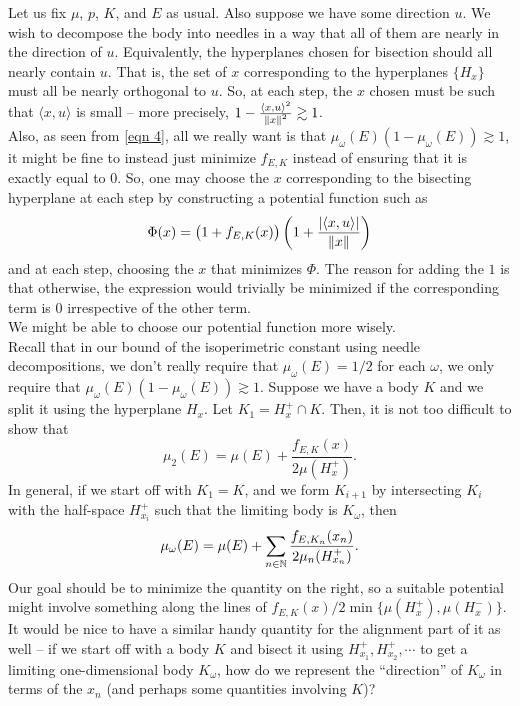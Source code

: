 \documentclass{article}
\begin{document}
		Let us fix $\mu$, $p$, $K$, and $E$ as usual. Also suppose we have some direction $u$. We wish to decompose the body into needles in a way that all of them are nearly in the direction of $u$. Equivalently, the hyperplanes chosen for bisection should all nearly contain $u$. That is, the set of $x$ corresponding to the hyperplanes $\{H_x\}$ must all be nearly orthogonal to $u$. So, at each step, the $x$ chosen must be such that $\langle x , u \rangle$ is small -- more precisely, $1 - \frac{\langle x , u \rangle^2}{\left\lVert x\right\rVert^2} \gtrsim 1$.\\
		Also, as seen from \eqref{eqn 4}, all we really want is that $\mu_\omega(E)(1-\mu_\omega(E)) \gtrsim 1$, it might be fine to instead just minimize $f_{E,K}$ instead of ensuring that it is exactly equal to $0$. So, one may choose the $x$ corresponding to the bisecting hyperplane at each step by constructing a potential function such as
		\[ \Phi(x) = \left(1 + f_{E,K}(x)\right) \left(1 + \frac{|\langle x , u \rangle|}{\left\lVert x\right\rVert}\right) \]
		and at each step, choosing the $x$ that minimizes $\Phi$. The reason for adding the $1$ is that otherwise, the expression would trivially be minimized if the corresponding term is $0$ irrespective of the other term.\\

		We might be able to choose our potential function more wisely.\\
		Recall that in our bound of the isoperimetric constant using needle decompositions, we don't really require that $\mu_\omega(E) = 1/2$ for each $\omega$, we only require that $\mu_\omega(E) (1 - \mu_\omega(E)) \gtrsim 1$. Suppose we have a body $K$ and we split it using the hyperplane $H_x$. Let $K_1 = H_x^+ \cap K$. Then, it is not too difficult to show that
		\[ \mu_2(E) = \mu(E) + \frac{f_{E,K}(x)}{2\mu(H_x^+)}. \]
		In general, if we start off with $K_1 = K$, and we form $K_{i+1}$ by intersecting $K_i$ with the half-space $H_{x_i}^+$ such that the limiting body is $K_\omega$, then
		\[ \mu_\omega(E) = \mu(E) + \sum_{n\in\mathbb{N}} \frac{f_{E,K_n}(x_n)}{2\mu_n(H_{x_n}^+)}. \]
		Our goal should be to minimize the quantity on the right, so a suitable potential might involve something along the lines of $f_{E,K}(x) / 2 \min\{ \mu(H_x^+) , \mu(H_x^-) \}$.\\

		It would be nice to have a similar handy quantity for the alignment part of it as well -- if we start off with a body $K$ and bisect it using $H_{x_1}^+, H_{x_2}^+, \cdots$ to get a limiting one-dimensional body $K_\omega$, how do we represent the ``direction'' of $K_\omega$ in terms of the $x_n$ (and perhaps some quantities involving $K$)?
\end{document}
